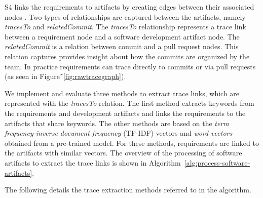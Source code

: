       \textsf{S4}  links the requirements to artifacts by creating edges between their associated nodes . 
      Two types of relationships are captured between the artifacts, namely \emph{tracesTo} and \emph{relatedCommit}. 
      The  \emph{tracesTo} relationship represents a trace link between a requirement node and a software development artifact node. 
      The \emph{relatedCommit} is a relation between commit and a pull request nodes. 
      This relation captures provides insight about how the commits are organized by the team. 
      In practice requirements can trace directly to commits or via pull requests (as seen in Figure˜\ref{fig:rawtracegraph}).

      We implement and evaluate three methods to extract trace links, which are represented with the \emph{tracesTo} relation. 
 The first method extracts keywords from the requirements and development artifacts and links the requirements to the artifacts that share keywords. 
 The other methods are based on the \textit{term frequency-inverse document frequency} (TF-IDF) vectors and \textit{word vectors} obtained from a pre-trained model.
For these methods, requirements are linked to the artifacts with similar vectors. 
      The overview of the processing of software artifacts to extract the trace links is shown in Algorithm~\ref{alg:process-software-artifacts}.
            
 The following details the trace extraction methods referred to in the algorithm. %


